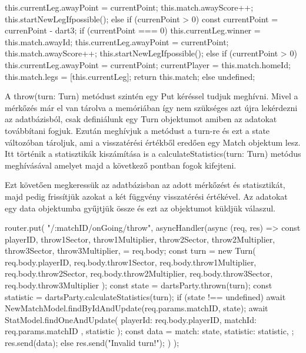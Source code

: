 \begin{cpp}
{{{{{{              this.currentLeg.awayPoint = currentPoint;
              this.match.awayScore++;
              this.startNewLegIfpossible();
            } else if (currenPoint > 0) {
              const currentPoint = currenPoint - dart3;
              if (currentPoint === 0) {
                this.currentLeg.winner = this.match.awayId;
                this.currentLeg.awayPoint = currentPoint;
                this.match.awayScore++;
                this.startNewLegIfpossible();
              } else if (currentPoint > 0) {
                this.currentLeg.awayPoint = currentPoint;
              }
            }
          }
          currentPlayer = this.match.homeId;
        }
      }
      this.match.legs = [this.currentLeg];
      return this.match;
    } else {
      undefined;
    }
  }
\end{cpp}

A throw(turn: Turn) metódust szintén egy Put kéréssel tudjuk meghívni. Mivel a mérkőzés már el van tárolva a memóriában így nem szükséges azt újra lekérdezni az adatbázisból, csak definiálunk egy Turn objektumot amiben az adatokat továbbítani fogjuk. Ezután meghívjuk a metódust a turn-re és ezt a state változóban tároljuk, ami a visszatérési értékből eredően egy Match objektum lesz. Itt történik a statisztikák kiszámítása is a calculateStatistics(turn: Turn) metódus meghívásával amelyet majd a következő pontban fogok kifejteni.

Ezt követően megkeressük az adatbázisban az adott mérkőzést és statisztikát, majd pedig frissítjük azokat a két függvény visszatérési értékével. Az adatokat egy data objektumba gyűjtjük össze és ezt az objektumot küldjük válaszul.

\begin{cpp}
router.put(
  "/:matchID/onGoing/throw",
  asyncHandler(async (req, res) => {
    const {
      playerID,
      throw1Sector,
      throw1Multiplier,
      throw2Sector,
      throw2Multiplier,
      throw3Sector,
      throw3Multiplier,
    } = req.body;
    const turn = new Turn(
      req.body.playerID,
      req.body.throw1Sector,
      req.body.throw1Multiplier,
      req.body.throw2Sector,
      req.body.throw2Multiplier,
      req.body.throw3Sector,
      req.body.throw3Multiplier
    );
    const state = dartsParty.thrown(turn);
    const statistic = dartsParty.calculateStatistics(turn);
    if (state !== undefined) {
      await NewMatchModel.findByIdAndUpdate(req.params.matchID, state);
      await StatModel.findOneAndUpdate(
        { playerId: req.body.playerID, matchId: req.params.matchID },
        statistic
      );
      const data = {
        match: state,
        statistic: statistic,
      };
      res.send(data);
    } else {
      res.send("Invalid turn!");
    }
  })
);
\end{cpp}


